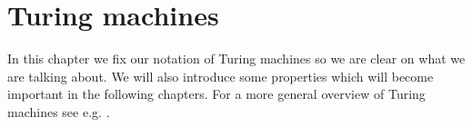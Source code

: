 \section{Turing machines}
\label{turing_machines}

In this chapter we fix our notation of Turing machines so we are clear on what we are talking about. We will also introduce some properties which will become important in the following chapters. For a more general overview of Turing machines see e.g. \cite{bbj07}.










